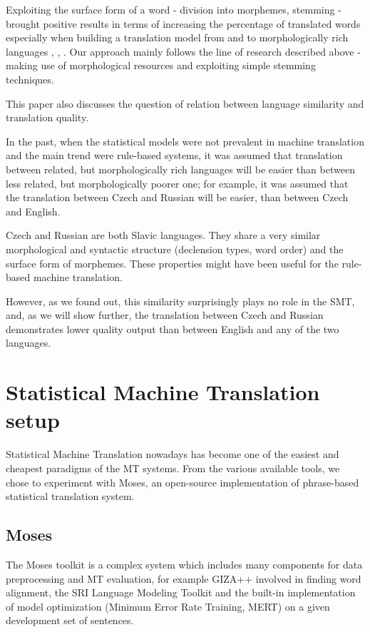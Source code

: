 \documentclass[11pt,letterpaper]{article}
\begin{document}
Exploiting the surface form of a word - division into morphemes, stemming - brought
positive results in terms of increasing the percentage of translated words 
especially when building a translation  model from and to morphologically rich languages \cite{popovic},
\cite{oflazer}, \cite{gispert}.  
Our approach mainly follows the line of research described above - making use of 
morphological resources and exploiting simple stemming techniques.

This paper also discusses the question of relation between language similarity and translation quality.

In the past, when the statistical models were not prevalent in machine translation and the main trend were rule-based systems, it was assumed that translation between related, but morphologically rich languages will be easier than between less related, but morphologically poorer one; for example, it was assumed that the translation between Czech and Russian will be easier, than between Czech and English.

Czech and Russian are both Slavic languages. They share a very similar morphological and syntactic
structure (declension types, word order) and the surface form of morphemes. These properties 
might have been useful for the rule-based machine translation. 

However, as we found out, this similarity surprisingly
 plays no role in the SMT, and, as we will show further,
the translation between Czech and Russian demonstrates lower quality output than 
between English and any of the two languages.

\section{Statistical Machine Translation setup}
Statistical Machine Translation nowadays has become one of the easiest and cheapest paradigms of the MT systems. 
From the various available tools, we chose to experiment with Moses, an open-source implementation of phrase-based statistical translation system.

\subsection{Moses}
The Moses toolkit \cite{moses} is a complex system which includes many components
for data preprocessing and MT evaluation, for example
GIZA++ %
involved in finding word alignment, the SRI Language Modeling
Toolkit %
and the built-in implementation of model optimization (Minimum Error Rate Training, MERT) on a
given development set of sentences.
\end{document}
